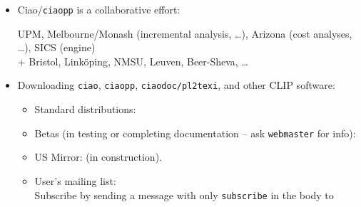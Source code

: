 \documentclass{article}
\renewcommand{\_}{\char'137}
\begin{document}
\begin{itemize}
\item Ciao/\texttt{ciaopp} is a collaborative effort:

     UPM, Melbourne/Monash (incremental analysis, \ldots), Arizona
     (cost  analyses, \ldots), SICS (engine) \\
     + Bristol, Link\"{o}ping, NMSU, Leuven, Beer-Sheva, \ldots 

\item Downloading \texttt{ciao}, \texttt{ciaopp},
  \texttt{ciaodoc/pl2texi}, and other CLIP software:
\begin{itemize}
  \item Standard distributions:\\  

  \item Betas (in testing or completing documentation --
    ask {\tt webmaster} for info): \\ 
  \item US Mirror: 
     (in construction).

  \item User's mailing list: \\
        Subscribe by sending a message with only \texttt{subscribe} in
        the body to \\
\end{itemize}

\end{itemize}


\newpage
\renewcommand{\refname}{Recent Bibliography on the ciaopp System Components}
{\normalsize


}
\end{document}
